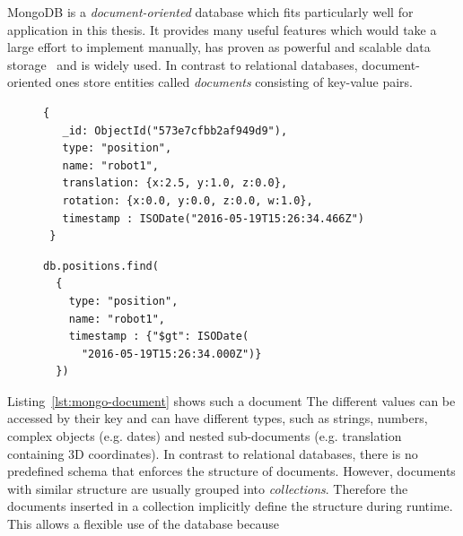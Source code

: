 \documentclass[a4paper,11pt]{article}
\newcommand{\reflst}[1]{Listing~\ref{#1}}
\begin{document}
MongoDB is a \emph{document-oriented}
database which fits particularly well for application in this thesis. It
provides many useful features which would take a large effort to
implement manually, has proven as powerful and scalable data
storage~\cite{mongodb,RoboDB} and is widely used. In contrast to
relational databases, document-oriented ones store entities called
\emph{documents} consisting of key-value pairs.
\begin{figure}
  \begin{minipage}{0.6\linewidth}
\begin{lstlisting}[style=SmallJSON,
  caption={MongoDB document representing\\ the position of a robot},
  label=lst:mongo-document,
  framexleftmargin=2pt, xleftmargin=2pt,
 morekeywords={}, numbers=none]
 {
   _id: ObjectId("573e7cfbb2af949d9"),
   type: "position",
   name: "robot1",
   translation: {x:2.5, y:1.0, z:0.0},
   rotation: {x:0.0, y:0.0, z:0.0, w:1.0},
   timestamp : ISODate("2016-05-19T15:26:34.466Z")
 }
\end{lstlisting}
  \end{minipage}
  \begin{minipage}{0.4\linewidth}
\begin{lstlisting}[style=SmallJSON,
  caption={MongoDB query for the document in \reflst{lst:mongo-document}},
  label=lst:mongo-query,
  framexleftmargin=2pt, xleftmargin=10pt,
 morekeywords={}, numbers=none]
db.positions.find(
  {
    type: "position",
    name: "robot1",
    timestamp : {"$gt": ISODate(
      "2016-05-19T15:26:34.000Z")}
  })
\end{lstlisting}
  \end{minipage}
\end{figure}
\reflst{lst:mongo-document} shows such a document
The different
values can be accessed by their key and can have different types, such
as strings, numbers, complex objects (e.g. dates) and nested
sub-documents (e.g. translation containing 3D coordinates). In
contrast to relational databases, there is no predefined schema that
enforces the structure of documents. However, documents with similar
structure are usually grouped into \emph{collections}. Therefore the
documents inserted in a collection implicitly define the structure
during runtime. This allows a flexible use of the database because
\end{document}

